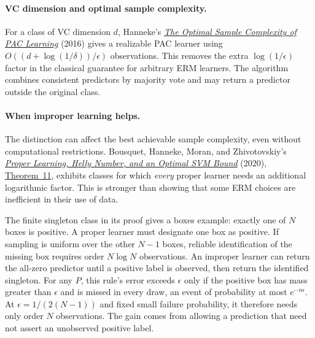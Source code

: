 \documentclass[11pt,twoside]{article}
\theoremstyle{definition}
\theoremstyle{remark}
\begin{document}
\paragraph{VC dimension and optimal sample complexity.}
For a class of VC dimension $d$, Hanneke's
\href{https://jmlr.org/papers/v17/15-389.html}{\emph{The Optimal Sample
Complexity of PAC Learning}} (2016) gives a realizable PAC learner using
$O((d+\log(1/\delta))/\epsilon)$ observations. This removes the extra
$\log(1/\epsilon)$ factor in the classical guarantee for arbitrary ERM
learners. The algorithm combines consistent predictors by majority vote and
may return a predictor outside the original class.

\paragraph{When improper learning helps.}
The distinction can affect the best achievable sample complexity, even
without computational restrictions. Bousquet, Hanneke, Moran, and
Zhivotovskiy's
\href{https://proceedings.mlr.press/v125/bousquet20a.html}{\emph{Proper
Learning, Helly Number, and an Optimal SVM Bound}} (2020),
\href{https://proceedings.mlr.press/v125/bousquet20a/bousquet20a.pdf\#page=10}{Theorem~11},
exhibits classes for which \emph{every} proper learner needs an additional
logarithmic factor. This is stronger than showing that some ERM choices
are inefficient in their use of data.

The finite singleton class in its proof gives a boxes example: exactly one
of $N$ boxes is positive. A proper learner must designate one box as
positive. If sampling is uniform over the other $N-1$ boxes, reliable
identification of the missing box requires order $N\log N$ observations.
An improper learner can return the all-zero predictor until a positive label
is observed, then return the identified singleton. For any $P$, this rule's
error exceeds $\epsilon$ only if the positive box has mass greater than
$\epsilon$ and is missed in every draw, an event of probability at most
$e^{-n\epsilon}$. At $\epsilon=1/(2(N-1))$ and fixed small failure
probability, it therefore needs only order $N$ observations. The gain comes
from allowing a prediction that need not assert an unobserved positive label.
\end{document}
